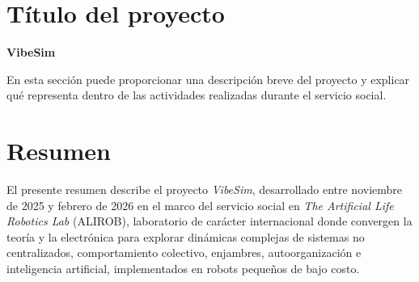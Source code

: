 \documentclass[12pt,a4paper]{article}
\newcommand{\NombreProyecto}{VibeSim}
\begin{document}
\section{Título del proyecto}

\textbf{\NombreProyecto}

En esta sección puede proporcionar una descripción breve del proyecto y
explicar qué representa dentro de las actividades realizadas durante el
servicio social.


\section{Resumen}

El presente resumen describe el proyecto \emph{VibeSim}, desarrollado entre noviembre de 2025 y febrero de 2026 en el marco del servicio social en \emph{The Artificial Life Robotics Lab} (ALIROB), laboratorio de carácter internacional donde convergen la teoría y la electrónica para explorar dinámicas complejas de sistemas no centralizados, comportamiento colectivo, enjambres, autoorganización e inteligencia artificial, implementados en robots pequeños de bajo costo.
\end{document}
